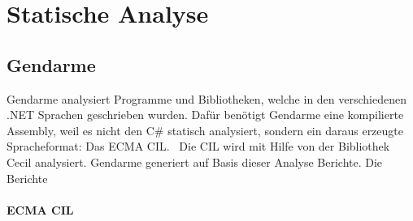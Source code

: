 %
\section{Statische Analyse}

\subsection{Gendarme}
Gendarme analysiert Programme und Bibliotheken, welche in den verschiedenen .NET Sprachen geschrieben wurden. Dafür benötigt Gendarme eine kompilierte Assembly, weil es nicht den C\# statisch analysiert, sondern ein daraus erzeugte Spracheformat: Das ECMA CIL.~\cite{ecma} Die CIL wird mit Hilfe von der Bibliothek Cecil analysiert. Gendarme generiert auf Basis dieser Analyse Berichte. Die Berichte 

\paragraph{ECMA CIL}
